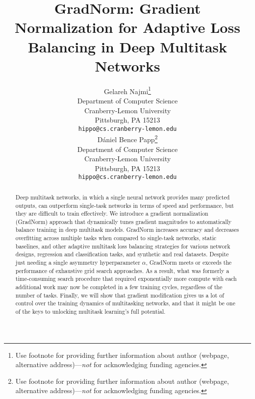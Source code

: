 \documentclass{article}
\title{GradNorm: Gradient Normalization for Adaptive
 Loss Balancing in Deep Multitask Networks}
\author{
 Gelareh Najmi\thanks{Use footnote for providing further information
    about author (webpage, alternative address)---\emph{not} for acknowledging
    funding agencies.} \\
  Department of Computer Science\\
  Cranberry-Lemon University\\
  Pittsburgh, PA 15213 \\
  \texttt{hippo@cs.cranberry-lemon.edu} \\
  \And
 Dániel Bence Papp\thanks{Use footnote for providing further information
    about author (webpage, alternative address)---\emph{not} for acknowledging
    funding agencies.} \\
  Department of Computer Science\\
  Cranberry-Lemon University\\
  Pittsburgh, PA 15213 \\
  \texttt{hippo@cs.cranberry-lemon.edu} \\
}
\begin{document}
\maketitle


\begin{abstract}
Deep multitask networks, in which a single neural network provides many predicted outputs, can outperform single-task networks in terms of speed and performance, but they are difficult to train effectively. We introduce a gradient normalization (GradNorm) approach that dynamically tunes gradient magnitudes to automatically balance training in deep multitask models. GradNorm increases accuracy and decreases overfitting across multiple tasks when compared to single-task networks, static baselines, and other adaptive multitask loss balancing strategies for various network designs, regression and classification tasks, and synthetic and real datasets. Despite just needing a single asymmetry hyperparameter $\alpha$, GradNorm meets or exceeds the performance of exhaustive grid search approaches. As a result, what was formerly a time-consuming search procedure that required exponentially more compute with each additional work may now be completed in a few training cycles, regardless of the number of tasks. Finally, we will show that gradient modification gives us a lot of control over the training dynamics of multitasking networks, and that it might be one of the keys to unlocking multitask learning's full potential.
\end{abstract}
\end{document}
